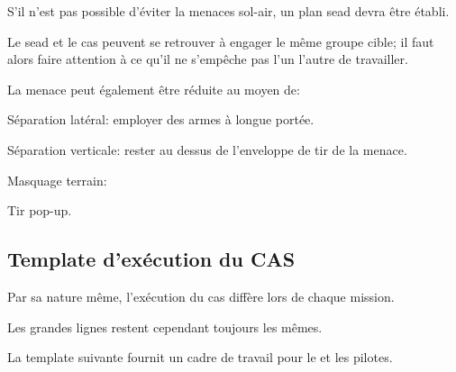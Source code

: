 \begin{e1}
	
	\begin{e2}
		
		\item S'il n'est pas possible d'éviter la menaces sol-air, un plan \gls{sead} devra être établi.
		
		\item Le \gls{sead} et le \gls{cas} peuvent se retrouver à engager le même groupe cible; il faut alors faire attention à ce qu'il ne s'empêche pas l'un l'autre de travailler.
		
		\item La menace peut également être réduite au moyen de:
		
		\begin{e3}
			
			\item Séparation latéral: employer des armes à longue portée.
			
			\item Séparation verticale: rester au dessus de l'enveloppe de tir de la menace.
			
			\item Masquage terrain:
			
			\begin{e4}
				
				\item Tir pop-up.
				
				
			\end{e4}
			
		\end{e3}
		
	\end{e2}
	
\end{e1}

\subsection{Template d'exécution du CAS}

Par sa nature même, l'exécution du \gls{cas} diffère lors de chaque mission.

Les grandes lignes restent cependant toujours les mêmes.

La template suivante fournit un cadre de travail pour le \ja{} et les pilotes.

